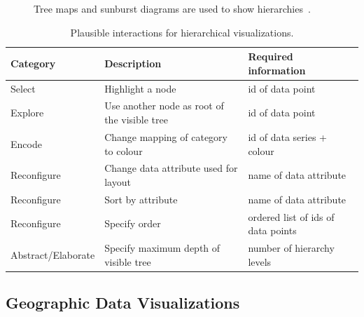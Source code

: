 \begin{figure}
  \centering
  \qquad
  \caption{Tree maps and sunburst diagrams are used to show hierarchies~\parencite{VisualizationCatalogue2017}.}%
  \label{fig:analysis:hierarchies}
\end{figure}

\begin{table}[H]
  \caption{Plausible interactions for hierarchical visualizations.}%
  \label{tab:analysis:hierarchies:interactions}
  \begin{tabularx}{\linewidth}{lXX}
    \bf Category & \bf Description & \bf Required information \\
    \hline
    Select & Highlight a node & id of data point \\
    Explore & Use another node as root of the visible tree & id of data point \\
    Encode & Change mapping of category to colour & id of data series + colour \\
    Reconfigure & Change data attribute used for layout & name of data attribute \\
    Reconfigure & Sort by attribute & name of data attribute \\
    Reconfigure & Specify order & ordered list of ids of data points \\
    Abstract/Elaborate & Specify maximum depth of visible tree & number of hierarchy levels \\
  \end{tabularx}
\end{table}

\subsection{Geographic Data Visualizations}


